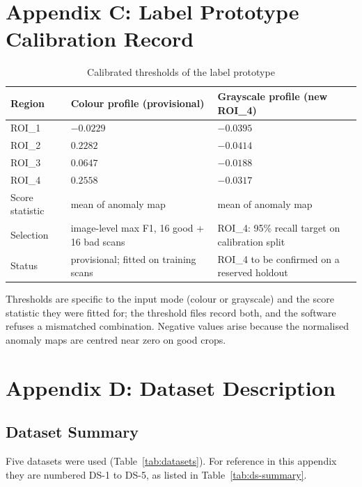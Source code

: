 \chapter{Appendix C: Label Prototype Calibration Record}
\label{appendix:label}

\begin{table}[htbp]
\centering
\caption{Calibrated thresholds of the label prototype}
\label{tab:label-thr}
\begin{tabularx}{\textwidth}{|L{2.6cm}|X|X|}
\hline
\textbf{Region} & \textbf{Colour profile (provisional)} & \textbf{Grayscale profile (new ROI\_4)} \\ \hline
ROI\_1 & $-0.0229$ & $-0.0395$ \\ \hline
ROI\_2 & $0.2282$ & $-0.0414$ \\ \hline
ROI\_3 & $0.0647$ & $-0.0188$ \\ \hline
ROI\_4 & $0.2558$ & $-0.0317$ \\ \hline
Score statistic & mean of anomaly map & mean of anomaly map \\ \hline
Selection & image-level max F1, 16 good + 16 bad scans & ROI\_4: 95\% recall target on calibration split \\ \hline
Status & provisional; fitted on training scans & ROI\_4 to be confirmed on a reserved holdout \\ \hline
\end{tabularx}
\end{table}

\noindent Thresholds are specific to the input mode (colour or grayscale) and the score statistic they were fitted for; the threshold files record both, and the software refuses a mismatched combination. Negative values arise because the normalised anomaly maps are centred near zero on good crops.

\chapter{Appendix D: Dataset Description}
\label{appendix:dataset}

\section{Dataset Summary}
Five datasets were used (Table~\ref{tab:datasets}). For reference in this appendix they are numbered DS-1 to DS-5, as listed in Table~\ref{tab:ds-summary}.

